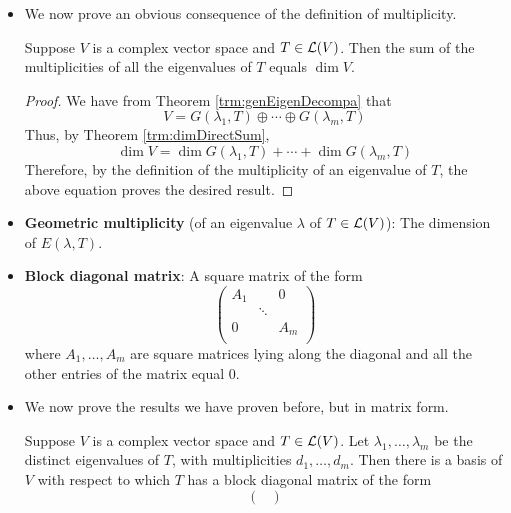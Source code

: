 \documentclass[../main.tex]{subfiles}
\begin{document}
\begin{itemize}
    \item We now prove an obvious consequence of the definition of multiplicity.
    \begin{theorem}\label{trm:dimGenEigenDecomp}
        Suppose $V$ is a complex vector space and $T\in\mathcal{L}(V)$. Then the sum of the multiplicities of all the eigenvalues of $T$ equals $\dim V$.
        \begin{proof}
            We have from Theorem \ref{trm:genEigenDecompa} that
            \begin{equation*}
                V = G(\lambda_1,T)\oplus\cdots\oplus G(\lambda_m,T)
            \end{equation*}
            Thus, by Theorem \ref{trm:dimDirectSum},
            \begin{equation*}
                \dim V = \dim G(\lambda_1,T)+\cdots+\dim G(\lambda_m,T)
            \end{equation*}
            Therefore, by the definition of the multiplicity of an eigenvalue of $T$, the above equation proves the desired result.
        \end{proof}
    \end{theorem}
    \item \textbf{Geometric multiplicity} (of an eigenvalue $\lambda$ of $T\in\mathcal{L}(V)$): The dimension of $E(\lambda,T)$.
    \item \textbf{Block diagonal matrix}: A square matrix of the form
    \begin{equation*}
        \begin{pmatrix}
            A_1 &  & 0\\
             & \ddots & \\
            0 &  & A_m\\
        \end{pmatrix}
    \end{equation*}
    where $A_1,\dots,A_m$ are square matrices lying along the diagonal and all the other entries of the matrix equal 0.
    \item We now prove the results we have proven before, but in matrix form.
    \begin{theorem}\label{trm:blockDiagonalUpperTriangular}
        Suppose $V$ is a complex vector space and $T\in\mathcal{L}(V)$. Let $\lambda_1,\dots,\lambda_m$ be the distinct eigenvalues of $T$, with multiplicities $d_1,\dots,d_m$. Then there is a basis of $V$ with respect to which $T$ has a block diagonal matrix of the form
        \begin{equation*}
            \begin{pmatrix}

\end{pmatrix}
\end{equation*}
\end{theorem}
\end{itemize}
\end{document}
